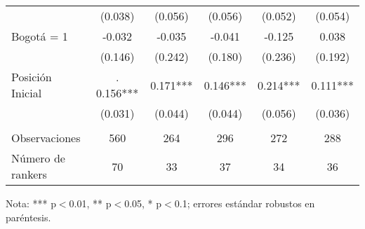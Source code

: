 \begin{table}[ht!]
\begin{threeparttable}
{\begin{tabular}{lccccc}
    	                                        &	(0.038)	&	(0.056)	&	(0.056)	&	(0.052)	        &	(0.054)	            \\
    Bogotá = 1	                                &	-0.032	&	-0.035	&	-0.041	&	-0.125	        &	0.038	            \\
                                            	&	(0.146)	&	(0.242)	&	(0.180)	&	(0.236)	        &	(0.192)	            \\
    Posición Inicial	                        &. 0.156*** & 0.171***	& 0.146***	&	0.214***	    &	0.111***	        \\
    	                                        &	(0.031)	&	(0.044)	&	(0.044)	&	(0.056)	        &	(0.036)	            \\

                                                &           &           &           &                   &                       \\
    Observaciones                               &   560     &   264     &   296     &   272             &   288                 \\
    Número de rankers                           &   70      &   33      &   37      &   34              &   36                  \\ \hline \hline
    \end{tabular}}
    \begin{tablenotes}
    \scriptsize{
    \item Nota: *** p$<$0.01, ** p$<$0.05, * p$<$0.1; errores estándar robustos en paréntesis.}
    \end{tablenotes}
    \end{threeparttable}
\end{table}

